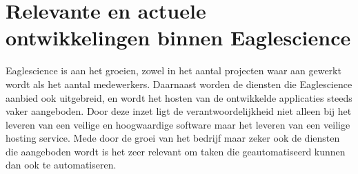 \section{Relevante en actuele ontwikkelingen binnen Eaglescience}
Eaglescience is aan het groeien, zowel in het aantal projecten waar aan gewerkt wordt als het aantal medewerkers. Daarnaast worden de diensten die Eaglescience aanbied ook uitgebreid, en wordt het hosten van de ontwikkelde applicaties steeds vaker aangeboden. Door deze inzet ligt de verantwoordelijkheid niet alleen bij het leveren van een veilige en hoogwaardige software maar het leveren van een veilige hosting service. Mede door de groei van het bedrijf maar zeker ook de diensten die aangeboden wordt is het zeer relevant om taken die geautomatiseerd kunnen dan ook te automatiseren.
